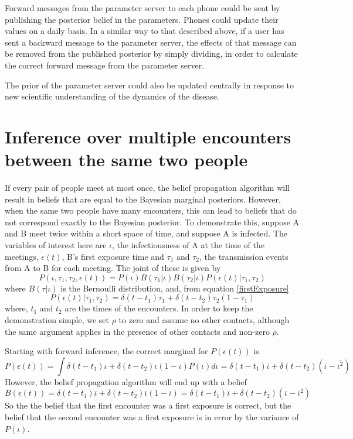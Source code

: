 \documentclass{article}
\begin{document}
Forward messages from the parameter server to each phone could be sent by publishing the posterior belief in the parameters. Phones could update their values on a daily basis. In a similar way to that described above, if a user has sent a backward message to the parameter server, the effects of that message can be removed from the published posterior by simply dividing, in order to calculate the correct forward message from the parameter server.

The prior of the parameter server could also be updated centrally in response to new scientific understanding of the dynamics of the disease.

\section{Inference over multiple encounters between the same two people}

If every pair of people meet at most once, the belief propagation algorithm will result in beliefs that are equal to the Bayesian marginal posteriors. However, when the same two people have many encounters, this can lead to beliefs that do not correspond exactly to the Bayesian posterior. To demonstrate this, suppose A and B meet twice within a short space of time, and suppose A is infected. The variables of interest here are $\iota$, the infectiousness of A at the time of the meetings, $\epsilon(t)$, B's first exposure time and $\tau_1$ and $\tau_2$, the transmission events from A to B for each meeting. The joint of these is given by
\[
P(\iota, \tau_1, \tau_2, \epsilon(t)) = P(\iota)B(\tau_1|\iota)B(\tau_2|\iota)P(\epsilon(t)|\tau_1,\tau_2)
\]
where $B(\tau|\iota)$ is the Bernoulli distribution, and, from equation \ref{firstExposure}
\[
P(\epsilon(t)|\tau_1,\tau_2) = \delta(t-t_1)\tau_1 + \delta(t-t_2)\tau_2(1-\tau_1)
\]
where, $t_1$ and $t_2$ are the times of the encounters. In order to keep the demonstration simple, we set $\rho$ to zero and assume no other contacts, although the same argument applies in the presence of other contacts and non-zero $\rho$.

Starting with forward inference, the correct marginal for $P(\epsilon(t))$ is
\[
P(\epsilon(t)) = \int \delta(t-t_1)\iota + \delta(t-t_2)\iota(1-\iota) P(\iota) d\iota = \delta(t-t_1)\overline{\iota} + \delta(t-t_2)\left(\overline{\iota} - \overline{\iota^2}\right) 
\]
However, the belief propagation algorithm will end up with a belief
\[
B(\epsilon(t)) = \delta(t-t_1)\overline{\iota} + \delta(t-t_2)\overline{\iota}(1-\overline{\iota}) = \delta(t-t_1)\overline{\iota} + \delta(t-t_2)\left(\overline{\iota}-\overline{\iota}^2\right)
\]
So the the belief that the first encounter was a first exposure is correct, but the belief that the second encounter was a first exposure is in error by the variance of $P(\iota)$.
\end{document}
